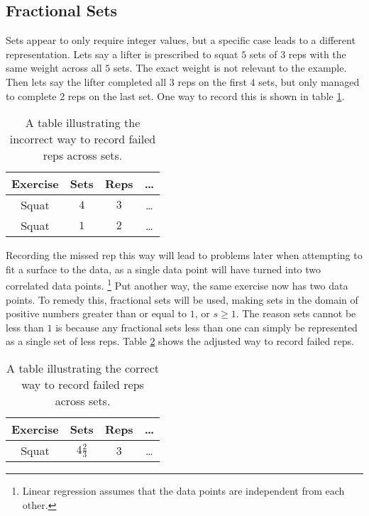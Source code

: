 \subsection{Fractional Sets}
\label{sec:FractionalSets}

Sets appear to only require integer values, but a specific case leads to a different representation. Lets say a lifter is prescribed to squat $5$ sets of $3$ reps with the same weight across all $5$ sets. The exact weight is not relevant to the example. Then lets say the lifter completed all $3$ reps on the first $4$ sets, but only managed to complete $2$ reps on the last set. One way to record this is shown in table \ref{tab:FailedSetExampleIncorrectData}.

\begin{table}[h]
    \centering
    \begin{tabular}{c|c|c|c}
        Exercise & Sets & Reps & \dots \\
        \hline
        Squat & $4$ & $3$ & \dots \\
        Squat & $1$ & $2$ & \dots \\ 
    \end{tabular}
    \caption{A table illustrating the incorrect way to record failed reps across sets.}
    \label{tab:FailedSetExampleIncorrectData}
\end{table}

Recording the missed rep this way will lead to problems later when attempting to fit a surface to the data, as a single data point will have turned into two correlated data points. \footnote{Linear regression assumes that the data points are independent from each other.} Put another way, the same exercise now has two data points. To remedy this, fractional sets will be used, making sets in the domain of positive numbers greater than or equal to $1$, or $s\ge 1$. The reason sets cannot be less than $1$ is because any fractional sets less than one can simply be represented as a single set of less reps. Table \ref{tab:FailedSetExampleCorrectData} shows the adjusted way to record failed reps.

\begin{table}[h]
    \centering
    \begin{tabular}{c|c|c|c}
        Exercise & Sets & Reps & \dots \\
        \hline
        Squat & $4\frac{2}{3}$ & 3 & \dots \\
    \end{tabular}
    \caption{A table illustrating the correct way to record failed reps across sets.}
    \label{tab:FailedSetExampleCorrectData}
\end{table}

